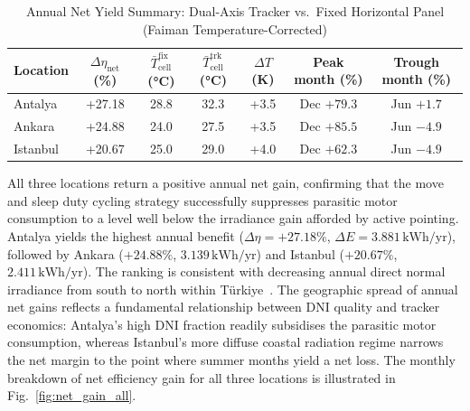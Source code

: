 \documentclass[preprint,3p,12pt]{elsarticle}
\begin{document}
\begin{table}[!ht]
\centering
\caption{Annual Net Yield Summary: Dual-Axis Tracker vs.\ Fixed
         Horizontal Panel (Faiman Temperature-Corrected)}
\label{tab:annual_summary}
\renewcommand{\arraystretch}{1.15}
\begin{tabular}{@{}lS[table-format=+2.2]
                    S[table-format=2.1]
                    S[table-format=2.1]
                    S[table-format=+1.1]
                    c c@{}}
\toprule
\textbf{Location} &
{\textbf{$\Delta\eta_{\mathrm{net}}$ (\%)}} &
{$\bar{T}_{\mathrm{cell}}^{\mathrm{fix}}$ (\si{\degreeCelsius})} &
{$\bar{T}_{\mathrm{cell}}^{\mathrm{trk}}$ (\si{\degreeCelsius})} &
{$\Delta T$ (K)} &
\textbf{Peak month (\%)} &
\textbf{Trough month (\%)} \\
\midrule
Antalya  & +27.18 & 28.8 & 32.3 & +3.5 &
    Dec $+79.3$ & Jun $+1.7$  \\
Ankara   & +24.88 & 24.0 & 27.5 & +3.5 &
    Dec $+85.5$ & Jun $-4.9$  \\
Istanbul & +20.67 & 25.0 & 29.0 & +4.0 &
    Dec $+62.3$ & Jun $-4.9$  \\
\bottomrule
\end{tabular}
\end{table}

All three locations return a positive annual net gain, confirming
that the move and sleep duty cycling strategy successfully suppresses
parasitic motor consumption to a level well below the irradiance
gain afforded by active pointing. Antalya yields the highest annual
benefit ($\Delta\eta = +27.18\%$, $\Delta E = 3.881\,\mathrm{kWh/yr}$),
followed by Ankara ($+24.88\%$, $3.139\,\mathrm{kWh/yr}$) and
Istanbul ($+20.67\%$, $2.411\,\mathrm{kWh/yr}$). The ranking is
consistent with decreasing annual direct normal irradiance from south
to north within Türkiye~\cite{PVGIS2023}. The geographic spread
of annual net gains reflects a fundamental relationship between DNI
quality and tracker economics: Antalya's high DNI fraction readily
subsidises the parasitic motor consumption, whereas Istanbul's more
diffuse coastal radiation regime narrows the net margin to the point
where summer months yield a net loss. The monthly breakdown of net
efficiency gain for all three locations is illustrated in
Fig.~\ref{fig:net_gain_all}.
\end{document}
